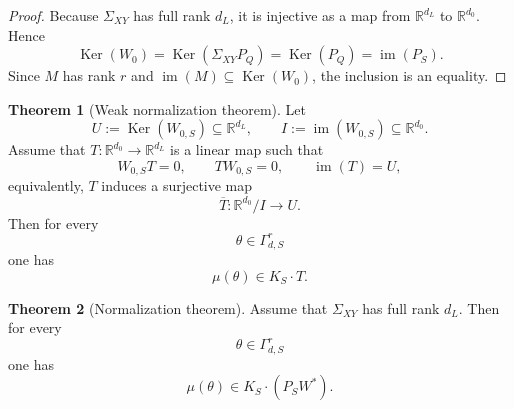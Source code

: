 \documentclass[11pt]{article}
\newcommand{\im}{\operatorname{im}}
\newcommand{\Ker}{\operatorname{Ker}}
\newcommand{\R}{\mathbb{R}}
\theoremstyle{definition}
\newtheorem{theorem}{Theorem}[section]
\begin{document}
\begin{proof}
Because \(\Sigma_{XY}\) has full rank \(d_L\), it is injective as a map from
\(\R^{d_L}\) to \(\R^{d_0}\). Hence
\[
\Ker(W_0)=\Ker(\Sigma_{XY}P_Q)=\Ker(P_Q)=\im(P_S).
\]
Since \(M\) has rank \(r\) and \(\im(M)\subseteq \Ker(W_0)\), the inclusion is
an equality.
\end{proof}
\begin{theorem}[Weak normalization theorem]
\label{thm:weak-normalization}
Let
\[
U:=\Ker(W_{0,S})\subseteq \R^{d_L},
\qquad
I:=\im(W_{0,S})\subseteq \R^{d_0}.
\]
Assume that \(T:\R^{d_0}\to \R^{d_L}\) is a linear map such that
\[
W_{0,S}T=0,
\qquad
TW_{0,S}=0,
\qquad
\im(T)=U,
\]
equivalently, \(T\) induces a surjective map
\[
\overline T:\R^{d_0}/I\to U.
\]
Then for every
\[
\theta\in \Gamma_{d,S}^r
\]
one has
\[
\mu(\theta)\in K_S\cdot T.
\]
\end{theorem}
\begin{theorem}[Normalization theorem]
\label{thm:normalization}
Assume that \(\Sigma_{XY}\) has full rank \(d_L\). Then for every
\[
\theta\in \Gamma_{d,S}^r
\]
one has
\[
\mu(\theta)\in K_S\cdot (P_SW^\ast).
\]
\end{theorem}
\end{document}
